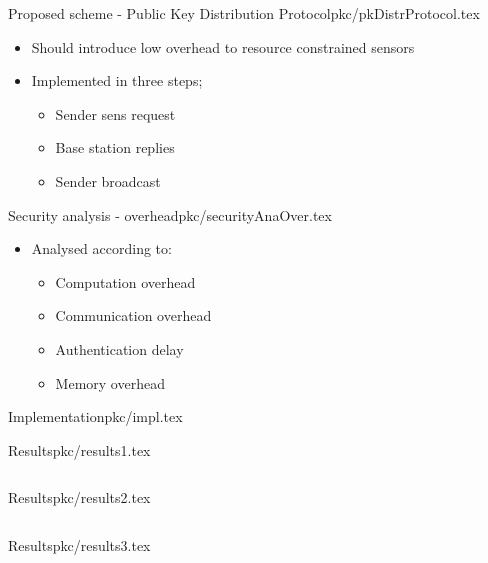 \begin{notedFrame}{Proposed scheme - Public Key Distribution Protocol}{pkc/pkDistrProtocol.tex}
    \begin{itemize}
        \item Should introduce low overhead to resource constrained sensors
        \item Implemented in three steps;
        \begin{itemize}
            \item Sender sens request
            \item Base station replies
            \item Sender broadcast
        \end{itemize} 
    \end{itemize}
\end{notedFrame}


\begin{notedFrame}{Security analysis - overhead}{pkc/securityAnaOver.tex}
    \begin{itemize}
        \item Analysed according to:
        \begin{itemize}
            \item Computation overhead
            \item Communication overhead
            \item Authentication delay
            \item Memory overhead
        \end{itemize}
    \end{itemize}
\end{notedFrame}


\begin{notedFrame}{Implementation}{pkc/impl.tex}
\end{notedFrame}


\begin{notedFrame}{Results}{pkc/results1.tex}
    \begin{columns}[T, onlytextwidth]
    \end{columns}
\end{notedFrame}


\begin{notedFrame}{Results}{pkc/results2.tex}
    \begin{columns}[T, onlytextwidth]
    \end{columns}
\end{notedFrame}


\begin{notedFrame}{Results}{pkc/results3.tex}
\end{notedFrame}